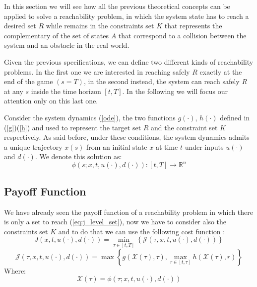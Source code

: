 In this section we will see how all the previous theoretical concepts can be applied to solve a reachability problem, in which the system state has to reach a desired set $R$ while remains in the constraints set $K$ that represents the complementary of the set of states $A$ that correspond to a collision between the system and an obstacle in the real world.

Given the previous specifications, we can define two different kinds of reachability problems. In the first one we are interested in reaching safely $R$ exactly at the end of the game $(s=T)$, in the second instead, the system can reach safely $R$ at any $s$ inside the time horizon $[t, T]$. In the following we will focus our attention only on this last one.

Consider the system dynamics (\ref{ode}), the two functions $g(\cdot)$, $h(\cdot)$ defined in (\ref{g})(\ref{h}) and used to represent the target set $R$ and the constraint set $K$ respectively. As said before, under these conditions, the system dynamics admits a unique trajectory $x(s)$ from an initial state $x$ at time $t$ under inputs $u(\cdot)$ and $d(\cdot)$. We denote this solution as:
\[
    \phi(s; x, t, u(\cdot), d(\cdot)) : [t, T] \rightarrow \mathbb{R}^n
\]

\subsection{Payoff Function}
We have already seen the payoff function of a reachability problem in which there is only a set to reach (\ref{eq:j_level_set}), now we have to consider also the constraints set $K$ and to do that we can use the following cost function \cite{new_paper}:
\begin{equation}
    \label{j_ras}
    J(x, t, u(\cdot), d(\cdot)) =  
        \min_{\tau \in [t, T]}
        \left\{
            \mathcal{J}(\tau, x, t, u(\cdot), d(\cdot))
        \right\}
\end{equation}
\begin{equation}
    \label{jj_ras}
    \mathcal{J}(\tau, x, t, u(\cdot), d(\cdot)) =  
        \max
        \left\{
            g(\mathcal{X}(\tau), \tau), \max_{r \in [t, \tau]}h(\mathcal{X}(\tau), r)            
        \right\}
\end{equation}
Where: 
\[\mathcal{X}(\tau)=\phi(\tau; x, t, u(\cdot), d(\cdot))\]

